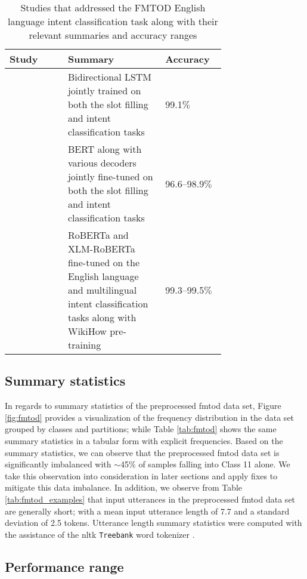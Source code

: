 \begin{table}[t!]
  \centering {}
  \begin{tabular}{L{0.27\linewidth} L{0.45\linewidth} l}
    \toprule
    Study & Summary & Accuracy \\
    \midrule
    \citet{schuster-etal-2019-cross-lingual} & Bidirectional LSTM jointly trained on both the slot filling and intent classification tasks & 99.1$\%$ \\
    \citet{zhang2019joint} & BERT along with various decoders jointly fine-tuned on both the slot filling and intent classification tasks & 96.6--98.9$\%$ \\
    \citet{zhang-etal-2020-intent} & RoBERTa and XLM-RoBERTa fine-tuned on the English language and multilingual intent classification tasks along with WikiHow pre-training & 99.3--99.5$\%$ \\
    \bottomrule
  \end{tabular}
  \caption{Studies that addressed the FMTOD English language intent
    classification task along with their relevant summaries and accuracy
    ranges}
  \label{tab:fmtod_results}
\end{table}

\subsection{Summary statistics}

\label{section:fmtod_summary}

In regards to summary statistics of the preprocessed \ac{fmtod} data set, Figure
\ref{fig:fmtod} provides a visualization of the frequency distribution in the
data set grouped by classes and partitions; while Table \ref{tab:fmtod} shows
the same summary statistics in a tabular form with explicit frequencies. Based
on the summary statistics, we can observe that the preprocessed \ac{fmtod} data set
is significantly imbalanced with $\sim$45$\%$ of samples falling into Class 11
alone. We take this observation into consideration in later sections and apply
fixes to mitigate this data imbalance. In addition, we observe from Table
\ref{tab:fmtod_examples} that input utterances in the preprocessed \ac{fmtod} data
set are generally short; with a mean input utterance length of 7.7 and a
standard deviation of 2.5 tokens. Utterance length summary statistics were
computed with the assistance of the \ac{nltk} \texttt{Treebank} word tokenizer
\citep{bird-loper-2004-nltk}.

\subsection{Performance range}

